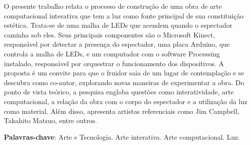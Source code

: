 \begin{RESUMO}
\thispagestyle{empty}
	\begin{SingleSpace}
	
		\hspace{-1.3 cm}O presente trabalho relata o processo de construção de uma obra de arte computacional interativa que tem a luz como fonte principal de sua constituição estética. Trata-se de uma malha de LEDs que acendem quando o espectador caminha sob eles. Seus principais componentes são o Microsoft Kinect, responsável por detectar a presença do espectador, uma placa Arduino, que controla a malha de LEDs, e um computador com o software Processing instalado, responsável por orquestrar o funcionamento dos dispositivos. A proposta é um convite para que o fruidor saia de um lugar de contemplação e se descubra como co-autor, explorando novas maneiras de experimentar a obra. Do ponto de vista teórico, a pesquisa engloba questões como interatividade, arte computacional, a relação da obra com o corpo do espectador e a utilização da luz como material. Além disso, apresenta artistas referenciais como Jim Campbell, Takahito Matsuo, entre outros.
		
		\vspace*{0.5cm}\hspace{-1.3 cm}\textbf{Palavras-chave}: Arte e Tecnologia. Arte interativa. Arte computacional. Luz.
		
	\end{SingleSpace}
\end{RESUMO}


